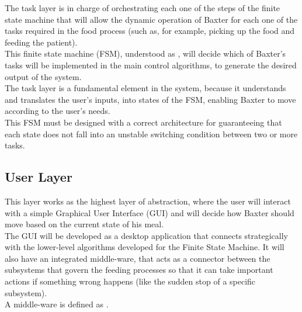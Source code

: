 \documentclass[11pt]{report} %
\begin{document}
The task layer is in charge of orchestrating each one of the steps of the finite state machine that will allow the dynamic operation of Baxter for each one of the tasks required in the food process (such as, for example, picking up the food and feeding the patient).\\

This finite state machine (FSM), understood as  \citep{cite_finite_state_machine_brilliant}, will decide which of Baxter's tasks will be implemented in the main control algorithms, to generate the desired output of the system.\\

The task layer is a fundamental element in the system, because it understands and translates the user's inputs, into states of the FSM, enabling Baxter to move according to the user's needs.\\

This FSM must be designed with a correct architecture for guaranteeing that each state does not fall into an unstable switching condition between two or more tasks.\\

\subsection{User Layer}

This layer works as the highest layer of abstraction, where the user will interact with a simple Graphical User Interface (GUI) and will decide how Baxter should move based on the current state of his meal.\\

The GUI will be developed as a desktop application that connects strategically with the lower-level algorithms developed for the Finite State Machine. It will also have an integrated middle-ware,  that acts as a connector between the subsystems that govern the feeding processes so that it can take important actions if something wrong happens (like the sudden stop of a specific subsystem).\\

A middle-ware is defined as  \citep{cite_middleware_definition_talend}.\\
\end{document}
